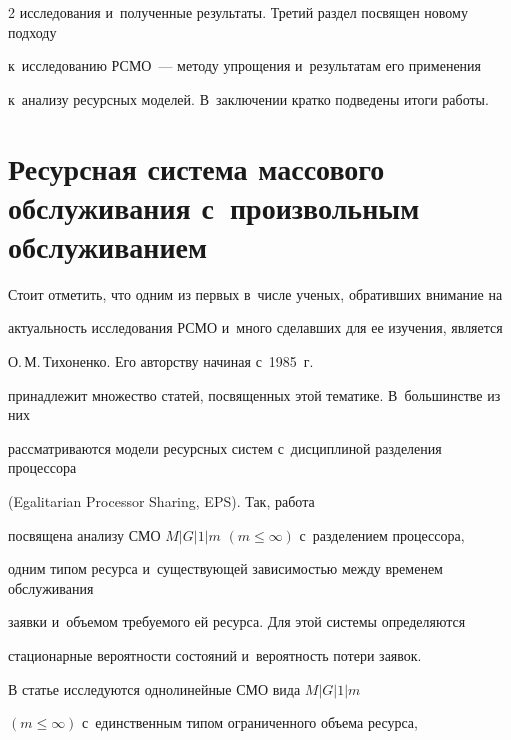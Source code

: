\begin{multicols}{2}
исследования и~полученные результаты. Третий раздел посвящен новому подходу 


к~исследованию РСМО~--- методу упрощения и~результатам его применения 


к~анализу ресурсных моделей. В~заключении кратко подведены итоги работы.













\section{Ресурсная система массового обслуживания с~произвольным обслуживанием}










Стоит отметить, что одним из первых в~числе ученых, обративших внимание на 


актуальность исследования РСМО и~много сделавших для ее изуче\-ния, является 


О.\,М.\,Тихоненко. Его авторству начиная с~1985~г.~\cite{Tihonenko_27_1985} 


принадлежит множество статей, посвященных этой тематике. В~большинстве из них 


рассматриваются модели ресурсных сис\-тем с~дисциплиной разделения процессора 


(Egalitarian Processor Sharing, EPS). Так, работа~\cite{Tihonenko_22_2001} 


посвящена анализу СМО $M|G|1|m$ $(m\leq\infty)$ с~разделением процессора, 


одним типом ресурса и~существующей зависимостью между временем обслуживания 


заявки и~объемом требуемого ей ресурса. Для этой сис\-те\-мы определяются 


стационарные вероятности состояний и~вероятность потери заявок.





В статье \cite{Tihonenko_24_1990} исследуются однолинейные СМО вида $M|G|1|m$ 


$(m\leq\infty)$ с~единственным типом ограниченного объема ресурса, 



\end{multicols}
